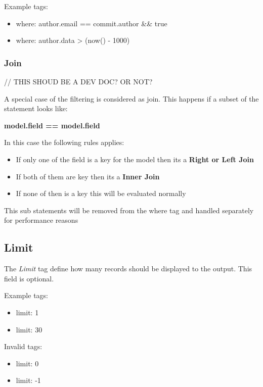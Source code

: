 Example tags:
\begin{itemize}
	\item where: author.email == commit.author \&\& true
	\item where: author.data > (now() - 1000)
\end{itemize}

\subsubsection{Join}

// THIS SHOUD BE A DEV DOC? OR NOT?

A special case of the filtering is considered as join. 
This happens if a subset of the statement looks like:\newline

\textbf{{model}.{field} == {model}.{field}}\newline

In this case the following rules applies:

\begin{itemize}
	\item If only one of the field is a key for the model then its a \textbf{Right or Left Join}
	\item If both of them are key then its a \textbf{Inner Join}
	\item If none of then is a key this will be evaluated normally
\end{itemize}

This sub statements will be removed from the where tag and handled separately for performance reasons

\subsection{Limit}

The \textit{Limit} tag define how many records should be displayed to the output.
This field is optional.

Example tags:
\begin{itemize}
	\item limit: 1
	\item limit: 30
\end{itemize}

Invalid tags:
\begin{itemize}
	\item limit: 0
	\item limit: -1
\end{itemize}


